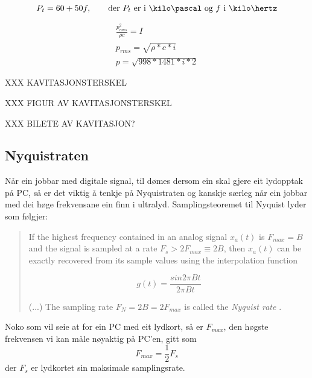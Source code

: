 \begin{equation}
\label{kavitasjonsterskel}
P_t = 60 + 50f, \qquad \text{der } P_t \text{ er i } \kilo\pascal \text{ og } f \text{ i } \kilo\hertz
\end{equation}

\begin{eqnarray}
	\label{kavitasjonsterskel2}
	\frac{p^2_{rms}}{\rho c} = I \\
	p_{rms} = \sqrt{\rho* c * i} \\
	p = \sqrt{998* 1481 * i * 2} 
\end{eqnarray}

XXX KAVITASJONSTERSKEL

XXX FIGUR AV KAVITASJONSTERSKEL

XXX BILETE AV KAVITASJON?
\subsection{Nyquistraten}
\label{nyquist}
Når ein jobbar med digitale signal, til dømes dersom ein skal gjere eit lydopptak på PC, så er det viktig å tenkje på Nyquistraten og kanskje særleg når ein jobbar med dei høge frekvensane ein finn i ultralyd. Samplingsteoremet til Nyquist lyder som følgjer:

\begin{quote}
If the highest frequency contained in an analog signal $x_a(t)$ is $F_{max} = B$ and the signal is sampled at a rate $F_s > 2F_{max} \equiv 2B$, then $x_a(t)$ can be exactly recovered from its sample values using the interpolation function

\begin{equation}
g(t) = \frac{sin 2\pi Bt}{2\pi Bt}
\end{equation}

(...) The sampling rate $F_N = 2B = 2F_{max}$ is called the \emph{Nyquist rate} \cite[s. 28]{Proakis:2006fk}.
\end{quote}

Noko som vil seie at for ein PC med eit lydkort, så er $F_{max}$, den høgste frekvensen vi kan måle nøyaktig på PC'en, gitt som
\begin{equation}
F_{max} = \frac{1}{2}F_s
\end{equation}
der $F_s$ er lydkortet sin maksimale samplingsrate.